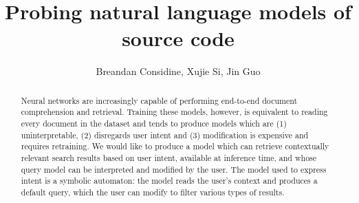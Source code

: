 \documentclass[sigconf]{acmart}
\begin{document}
  \title{Probing natural language models of source code}

  \author{Breandan Considine, Xujie Si, Jin Guo}


  \begin{abstract}
    Neural networks are increasingly capable of performing end-to-end document comprehension and retrieval. Training these models, however, is equivalent to reading every document in the dataset and tends to produce models which are (1) uninterpretable, (2) disregards user intent and (3) modification is expensive and requires retraining. We would like to produce a model which can retrieve contextually relevant search results based on user intent, available at inference time, and whose query model can be interpreted and modified by the user. The model used to express intent is a symbolic automaton: the model reads the user's context and produces a default query, which the user can modify to filter various types of results.
  \end{abstract}

\end{document}
